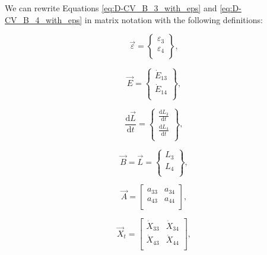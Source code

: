 We can rewrite Equations \ref{eq:D-CV_B_3_with_eps} and \ref{eq:D-CV_B_4_with_eps} in matrix notation with the following definitions:

\begin{equation} \label{eq:D-eps_vec_def}
	\vec{\varepsilon} =		\begin{Bmatrix} 	\varepsilon_{3}	\\
																\varepsilon_{4}	\\
									\end{Bmatrix},
\end{equation}

\begin{equation} \label{eq:D-E_vec_def}
	\vec{E} =		\begin{Bmatrix} 	\dot{E}_{13}	\\
													\dot{E}_{14}\\
						\end{Bmatrix},
\end{equation}

\begin{equation} \label{eq:D-dLdt_vec_def}
	\frac{\mathrm{d}\vec{L}}{\mathrm{d}t} =	\begin{Bmatrix}	\frac{\mathrm{d}L_{3}}{\mathrm{d}t}	\\
																									\frac{\mathrm{d}L_{4}}{\mathrm{d}t}\\
																		\end{Bmatrix},
\end{equation}

\begin{equation} \label{eq:B_vec_def}
	\vec{B} =	\vec{L} =		\begin{Bmatrix}	L_{3}\\
																	L_{4}\\
										\end{Bmatrix},
\end{equation}

\begin{equation} \label{eq:D-A_matrix_def}
	\vec{A} =	\begin{bmatrix} 	a_{33} & a_{34}	\\
												a_{43} & a_{44}	\\
					\end{bmatrix},
\end{equation}

\begin{equation} \label{eq:D-X_t_matrix_def}
	\vec{X}_{t} =		\begin{bmatrix} 	\dot{X}_{33}		&	\dot{X}_{34}	\\
														\dot{X}_{43}		&	\dot{X}_{44}\\
							\end{bmatrix},
\end{equation}

